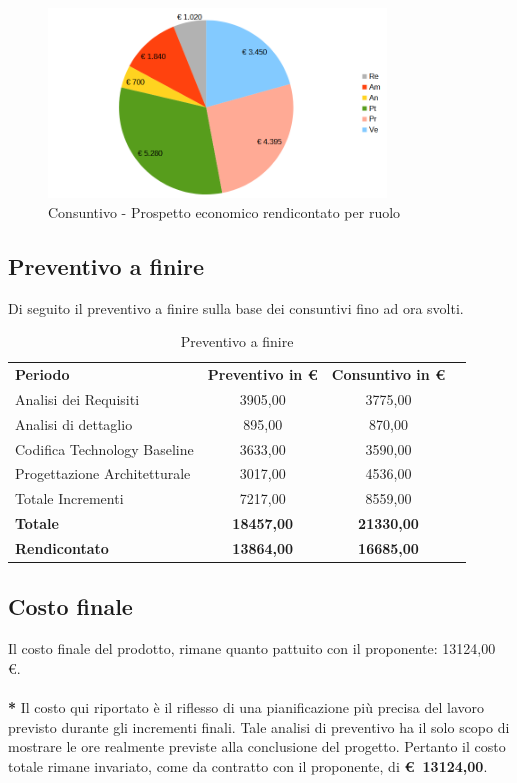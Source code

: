 \begin{figure} [h!]
	\centering
	\includegraphics[width=0.8\textwidth]{res/img/grafici/consuntivo-torta-costo finale-rendicontato.png}
	\caption{Consuntivo - Prospetto economico rendicontato per ruolo} 
\end{figure}

\clearpage
\subsection{Preventivo a finire}
Di seguito il preventivo a finire sulla base dei consuntivi fino ad ora svolti.
\begin{table} [h!]
	\begin{center}
		\begin{tabular} { m{8 cm} c c c  }
			\rowcolor{lightgray}
			\textbf{Periodo}  & \textbf{Preventivo in \euro} & \textbf{Consuntivo in \euro} \\
			Analisi dei Requisiti   			& 3905,00     & 3775,00 \\
			Analisi di dettaglio  				& 895,00     & 870,00 \\
			Codifica Technology Baseline        & 3633,00     & 3590,00 \\
			Progettazione Architetturale		&3017,00		&  4536,00\\
			Totale Incrementi					& 7217,00		&	8559,00\\
			\textbf{Totale}     & \textbf{18457,00}         & \textbf{21330,00}   \\
			\textbf{Rendicontato}  & \textbf{13864,00}          & \textbf{16685,00}   \\
			
			
		\end{tabular}
		\caption{Preventivo a finire }
	\end{center}
\end{table}

\subsection{Costo finale}
Il costo finale del prodotto, rimane quanto pattuito con il proponente: 13124,00 \euro.\\
	\\
\textbf{*} Il costo qui riportato è il riflesso di una pianificazione più precisa del lavoro previsto durante gli incrementi finali. Tale analisi di preventivo ha il solo scopo di mostrare le ore realmente previste alla conclusione del progetto. Pertanto il costo totale rimane invariato, come da contratto con il proponente, di \textbf{\euro \ 13124,00}.